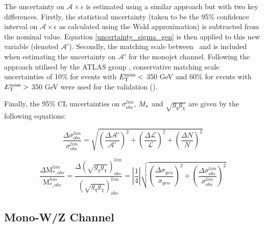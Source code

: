 
The uncertainty on $\mathcal{A} \times \epsilon$ is estimated using a similar approach but with two key differences. Firstly, the statistical uncertainty (taken to be the 95\% confidence interval on $\mathcal{A}\times\epsilon$ as calculated using the Wald approximation) is subtracted from the nominal value. Equation \ref{uncertainty_sigma_gen} is then applied to this new variable (denoted $\mathcal{A}'$). Secondly, the matching scale between \MG\mbox{ }and \PYTHIA is included when estimating the uncertainty on $\mathcal{A}'$ for the monojet channel. Following the approach utilised by the ATLAS group \cite{CERN-THESIS-2015-038}, conservative matching scale uncertainties of 10\% for events with $E_{\mathrm{T}}^{\mathrm{miss}} <$ 350 GeV and 60\% for events with $E_{\mathrm{T}}^{\mathrm{miss}} >$ 350 GeV were used for the validation ().


Finally, the 95\% CL uncertainties on $\sigma_{obs}^{lim}$, $M_{\star}$ and $\sqrt{g_q g_{\chi}}$ are given by the following equations:

\begin{equation}
\label{uncertainty_sigma_lim}
\frac{\Delta \sigma_{obs}^{lim}}{\sigma_{obs}^{lim}} = \sqrt{\left(\frac{\Delta \mathcal{A}'}{\mathcal{A}'}\right)^{2} + \left(\frac{\Delta \mathcal{L}}{\mathcal{L}}\right)^{2} + \left(\frac{\Delta N}{N}\right)^{2}}
\end{equation}

\begin{equation}
\label{uncertainty_M_star}
\frac{\Delta \mbox{M}_{*,obs}^{lim}}{\mbox{M}_{*,obs}^{lim}} = \frac{\Delta (\sqrt{g_{q}g_{\chi}})_{obs}^{lim}}{(\sqrt{g_{q}g_{\chi}})_{obs}^{lim}} = \left|\frac{1}{4}\right|\sqrt{\left(\frac{\Delta \sigma_{gen}}{\sigma_{gen}}\right)^{2} + \left(\frac{\Delta \sigma_{obs}^{lim}}{\sigma_{obs}^{lim}}\right)^{2}}
\end{equation}

\subsection{Mono-W/Z Channel}
\label{monoWZ_validation}

\fi
